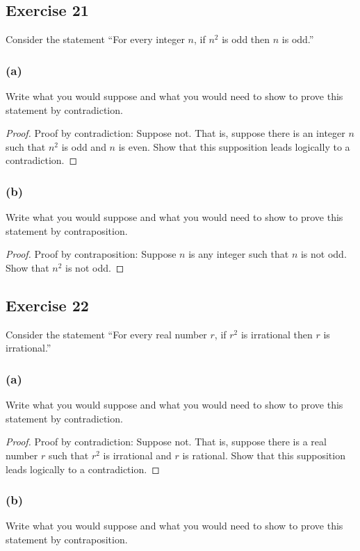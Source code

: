 \documentclass[14pt]{extarticle}
\begin{document}
\subsection{Exercise 21}
Consider the statement “For every integer $n$, if $n^2$ is odd then $n$ is odd.”

\subsubsection{(a)}
Write what you would suppose and what you would need to show to prove this statement by contradiction.

\begin{proof}
    Proof by contradiction: Suppose not. That is, suppose there is an integer $n$ such that $n^2$ is odd and $n$ is even. Show that this supposition leads logically to a contradiction.

\end{proof}

\subsubsection{(b)}
Write what you would suppose and what you would need to show to prove this statement by contraposition.

\begin{proof}
    Proof by contraposition: Suppose $n$ is any integer such
    that $n$ is not odd. Show that $n^2$ is not odd.
\end{proof}

\subsection{Exercise 22}
Consider the statement “For every real number $r$, if $r^2$ is irrational then $r$ is irrational.”

\subsubsection{(a)}
Write what you would suppose and what you would need to show to prove this statement by contradiction.

\begin{proof}
    Proof by contradiction: Suppose not. That is, suppose there is a real number $r$ such that $r^2$ is irrational and $r$ is rational. Show that this supposition leads logically to a contradiction.
\end{proof}

\subsubsection{(b)}
Write what you would suppose and what you would need to show to prove this statement by contraposition.
\end{document}
